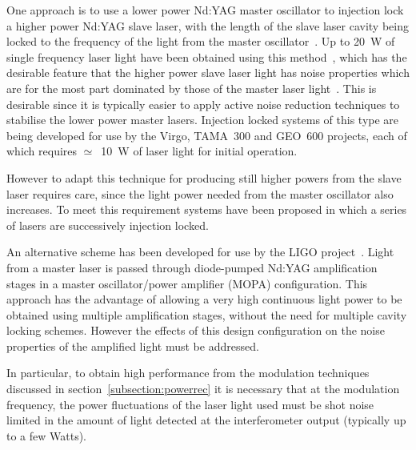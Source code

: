 \documentclass{article}
\begin{document}
One approach is to use a lower power Nd:YAG master oscillator to injection lock
a higher power Nd:YAG slave laser, with the length of the slave laser cavity
being locked to the frequency of the light from the master
oscillator~\cite{Cregut, Nabors, Golla}. Up to 20~W of single frequency laser
light have been obtained using this method~\cite{Shine}, which has the desirable
feature that the higher power slave laser light has noise properties which are
for the most part dominated by those of the master laser light~\cite{Farinas}.
This is desirable since it is typically easier to apply active noise reduction
techniques to stabilise the lower power master lasers. Injection locked systems
of this type are being developed for use by the Virgo, TAMA~300 and GEO~600
projects, each of which requires $\simeq$~10~W of laser light for initial
operation.

However to adapt this technique for producing still higher powers from the slave
laser requires care, since the light power needed from the master oscillator
also increases. To meet this requirement systems have been proposed in which a
series of lasers are successively injection locked.

An alternative scheme has been developed for use by the LIGO
project~\cite{Weichmann}. Light from a master laser is passed through
diode-pumped Nd:YAG amplification stages in a master oscillator/power amplifier
(MOPA) configuration. This approach has the advantage of allowing a very high
continuous light power to be obtained using multiple amplification stages,
without the need for multiple cavity locking schemes.  However the effects of
this design configuration on the noise properties of the amplified light must be
addressed.                                               

In particular, to obtain high performance from the modulation techniques
discussed in section~\ref{subsection:powerrec} it is necessary that at the
modulation frequency, the power fluctuations of the laser light used must be
shot noise limited in the amount of light detected at the interferometer output
(typically up to a few Watts).
\end{document}
